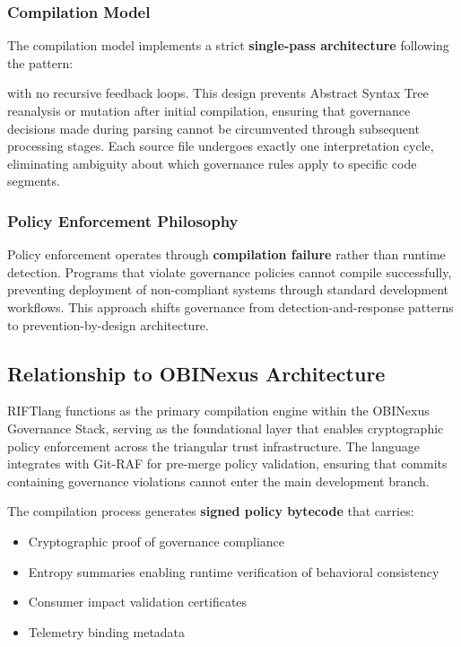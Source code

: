 \subsubsection{Compilation Model}

The compilation model implements a strict \textbf{single-pass architecture} following the pattern:

\begin{center}
\end{center}

with no recursive feedback loops. This design prevents Abstract Syntax Tree reanalysis or mutation after initial compilation, ensuring that governance decisions made during parsing cannot be circumvented through subsequent processing stages. Each source file undergoes exactly one interpretation cycle, eliminating ambiguity about which governance rules apply to specific code segments.

\subsubsection{Policy Enforcement Philosophy}

Policy enforcement operates through \textbf{compilation failure} rather than runtime detection. Programs that violate governance policies cannot compile successfully, preventing deployment of non-compliant systems through standard development workflows. This approach shifts governance from detection-and-response patterns to prevention-by-design architecture.

\subsection{Relationship to OBINexus Architecture}

RIFTlang functions as the primary compilation engine within the OBINexus Governance Stack, serving as the foundational layer that enables cryptographic policy enforcement across the triangular trust infrastructure. The language integrates with Git-RAF for pre-merge policy validation, ensuring that commits containing governance violations cannot enter the main development branch.

The compilation process generates \textbf{signed policy bytecode} that carries:
\begin{itemize}
\item Cryptographic proof of governance compliance
\item Entropy summaries enabling runtime verification of behavioral consistency
\item Consumer impact validation certificates
\item Telemetry binding metadata
\end{itemize}

